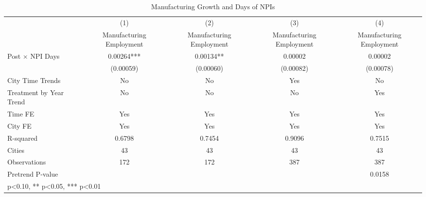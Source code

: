 \begin{table}[htbp]\centering
\def\sym#1{\ifmmode^{#1}\else\(^{#1}\)\fi}
\caption{Manufacturing Growth and Days of NPIs}
\begin{tabular}{l*{4}{c}}
\hline\hline
                    &\multicolumn{1}{c}{(1)}   &\multicolumn{1}{c}{(2)}   &\multicolumn{1}{c}{(3)}   &\multicolumn{1}{c}{(4)}   \\
                    &Manufacturing Employment   &Manufacturing Employment   &Manufacturing Employment   &Manufacturing Employment   \\
\hline
Post $\times$ NPI Days&     0.00264***&     0.00134** &     0.00002   &     0.00002   \\
                    &   (0.00059)   &   (0.00060)   &   (0.00082)   &   (0.00078)   \\
City Time Trends    &          No   &          No   &         Yes   &          No   \\
Treatment by Year Trend &          No   &          No   &          No   &         Yes   \\
Time FE             &         Yes   &         Yes   &         Yes   &         Yes   \\
\hline
City FE             &         Yes   &         Yes   &         Yes   &         Yes   \\
R-squared           &      0.6798   &      0.7454   &      0.9096   &      0.7515   \\
Cities              &          43   &          43   &          43   &          43   \\
Observations        &         172   &         172   &         387   &         387   \\
Pretrend P-value    &               &               &               &      0.0158   \\
\hline\hline
\multicolumn{5}{l}{\footnotesize * p<0.10, ** p<0.05, *** p<0.01}\\
\end{tabular}
\end{table}
